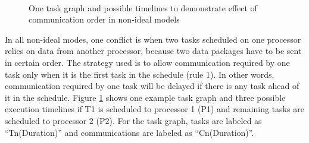 \documentclass[msc,deptreport, cs]{infthesis}
\begin{document}
\begin{figure}[!htb]
  \centering
  \vspace{1em}
  \hspace{3em}
   \hspace{4em}
   \\
   \hspace{1em}
  \caption{One task graph and possible timelines to demonstrate effect of communication order in non-ideal models}
  \label{fig:conflict1}
\end{figure}

In all non-ideal modes, one conflict is when two tasks scheduled on one processor relies on data from another processor, because two data packages have to be sent in certain order. The strategy used is to allow communication required by one task only when it is the first task in the schedule (rule 1). In other words, communication required by one task will be delayed if there is any task ahead of it in the schedule. Figure \ref{fig:conflict1} shows one example task graph and three possible execution timelines if T1 is scheduled to processor 1 (P1) and remaining tasks are scheduled to processor 2 (P2). For the task graph, tasks are labeled as ``Tn(Duration)'' and communications are labeled as ``Cn(Duration)''.
\end{document}
